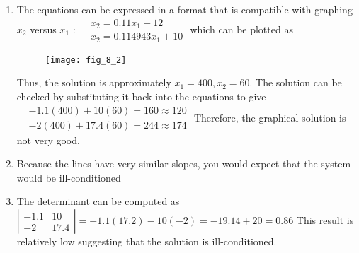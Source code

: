 \documentclass[../main.tex]{subfiles}
\begin{document}
\section{}
\begin{enumerate}[label=\bfseries(\alph*)]
\item The equations can be expressed in a format that is compatible with graphing $x_{2}$ versus $x_{1}$ :
\bigbreak$
\begin{aligned}
&x_{2}=0.11 x_{1}+12 \\
&x_{2}=0.114943 x_{1}+10
\end{aligned}$
\bigbreak
which can be plotted as
\bigbreak
\begin{figure}[H]
		\hspace*{1cm}\texttt{[image: fig\_8\_2]}
		\label{fig:fig_8_2}
	\end{figure}
	\bigbreak
	
Thus, the solution is approximately $x_{1}=400, x_{2}=60$. The solution can be checked by substituting it back into the equations to give
\bigbreak$
\begin{aligned}
&-1.1(400)+10(60)=160 \approx 120 \\
&-2(400)+17.4(60)=244 \approx 174
\end{aligned}$
\bigbreak
Therefore, the graphical solution is not very good.
\bigbreak
\item Because the lines have very similar slopes, you would expect that the system would be ill-conditioned
\bigbreak
\item The determinant can be computed as
\bigbreak
$\left|\begin{array}{cc}
-1.1 & 10 \\
-2 & 17.4
\end{array}\right|=-1.1(17.2)-10(-2)=-19.14+20=0.86$
\bigbreak
This result is relatively low suggesting that the solution is ill-conditioned.
\bigbreak
\end{enumerate}
\end{document}
